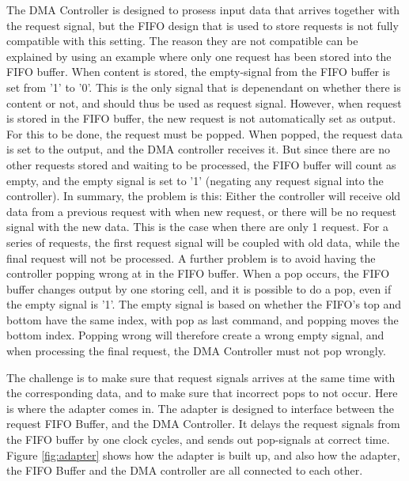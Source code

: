 The DMA Controller is designed to prosess input data that arrives together with the request signal, but the FIFO design that is used to store requests is not fully compatible with this setting.
The reason they are not compatible can be explained by using an example where only one request has been stored into the FIFO buffer.
When content is stored, the empty-signal from the FIFO buffer is set from '1' to '0'.
This is the only signal that is depenendant on whether there is content or not, and should thus be used as request signal.
However, when request is stored in the FIFO buffer, the new request is not automatically set as output.
For this to be done, the request must be popped.
When popped, the request data is set to the output, and the DMA controller receives it.
But since there are no other requests stored and waiting to be processed, the FIFO buffer will count as empty, and the empty signal is set to '1' (negating any request signal into the controller).
In summary, the problem is this: Either the controller will receive old data from a previous request with when new request, or there will be no request signal with the new data.
This is the case when there are only 1 request.
For a series of requests, the first request signal will be coupled with old data, while the final request will not be processed.
A further problem is to avoid having the controller popping wrong at in the FIFO buffer.
When a pop occurs, the FIFO buffer changes output by one  storing cell, and it is possible to do a pop, even if the empty signal is '1'.
The empty signal is based on whether the FIFO's top and bottom have the same index, with pop as last command, and popping moves the bottom index.
Popping wrong will therefore create a wrong empty signal, and when processing the final request, the DMA Controller must not pop wrongly.

\par
The challenge is to make sure that request signals arrives at the same time with the corresponding data, and to make sure that incorrect pops to not occur.
Here is where the adapter comes in.
The adapter is designed to interface between the request FIFO Buffer, and the DMA Controller. 
It delays the request signals from the FIFO buffer by one clock cycles, and sends out pop-signals at correct time.
Figure \ref{fig:adapter} shows how the adapter is built up, and also how the adapter, the FIFO Buffer and the DMA controller are all connected to each other.


